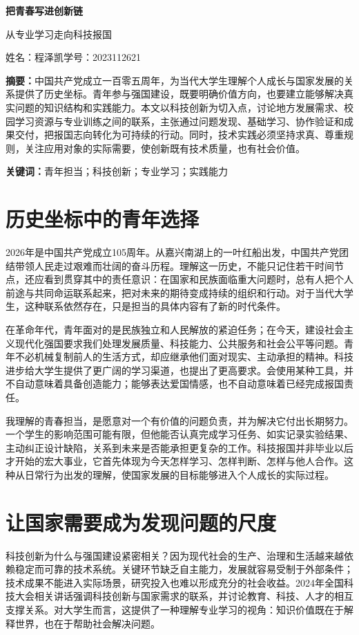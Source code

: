 \documentclass[UTF8,a4paper,zihao=-4,fontset=fandol]{ctexart}
\newcommand{\bodyfont}{\fontsize{12bp}{18bp}\selectfont}
\begin{document}
\bodyfont
\begin{center}
  {\bfseries 把青春写进创新链}\par\vspace{5pt}
  {\large 从专业学习走向科技报国}\par\vspace{12pt}
  姓名：程泽凯\qquad 学号：2023112621
\end{center}
\vspace{6pt}
\noindent\textbf{摘要：}中国共产党成立一百零五周年，为当代大学生理解个人成长与国家发展的关系提供了历史坐标。青年参与强国建设，既要明确价值方向，也要建立能够解决真实问题的知识结构和实践能力。本文以科技创新为切入点，讨论地方发展需求、校园学习资源与专业训练之间的联系，主张通过问题发现、基础学习、协作验证和成果交付，把报国志向转化为可持续的行动。同时，技术实践必须坚持求真、尊重规则，关注应用对象的实际需要，使创新既有技术质量，也有社会价值。

\noindent\textbf{关键词：}青年担当；科技创新；专业学习；实践能力

\section{历史坐标中的青年选择}
2026年是中国共产党成立105周年。从嘉兴南湖上的一叶红船出发，中国共产党团结带领人民走过艰难而壮阔的奋斗历程。理解这一历史，不能只记住若干时间节点，还应看到贯穿其中的责任意识：在国家和民族面临重大问题时，总有人把个人前途与共同命运联系起来，把对未来的期待变成持续的组织和行动。对于当代大学生，这种联系依然存在，只是担当的具体内容有了新的时代条件。

在革命年代，青年面对的是民族独立和人民解放的紧迫任务；在今天，建设社会主义现代化强国要求我们处理发展质量、科技能力、公共服务和社会公平等问题。青年不必机械复制前人的生活方式，却应继承他们面对现实、主动承担的精神。科技进步给大学生提供了更广阔的学习渠道，也提出了更高要求。会使用某种工具，并不自动意味着具备创造能力；能够表达爱国情感，也不自动意味着已经完成报国责任。

我理解的青春担当，是愿意对一个有价值的问题负责，并为解决它付出长期努力。一个学生的影响范围可能有限，但他能否认真完成学习任务、如实记录实验结果、主动纠正设计缺陷，关系到未来是否能承担更复杂的工作。科技报国并非毕业以后才开始的宏大事业，它首先体现为今天怎样学习、怎样判断、怎样与他人合作。这种从日常行为出发的理解，使国家发展的目标能够进入个人成长的实际过程。

\section{让国家需要成为发现问题的尺度}
科技创新为什么与强国建设紧密相关？因为现代社会的生产、治理和生活越来越依赖稳定而可靠的技术系统。关键环节缺乏自主能力，发展就容易受制于外部条件；技术成果不能进入实际场景，研究投入也难以形成充分的社会收益。2024年全国科技大会相关讲话强调科技创新与国家需求的联系，并讨论教育、科技、人才的相互支撑关系\cite{science}。对大学生而言，这提供了一种理解专业学习的视角：知识价值既在于解释世界，也在于帮助社会解决问题。
\end{document}
